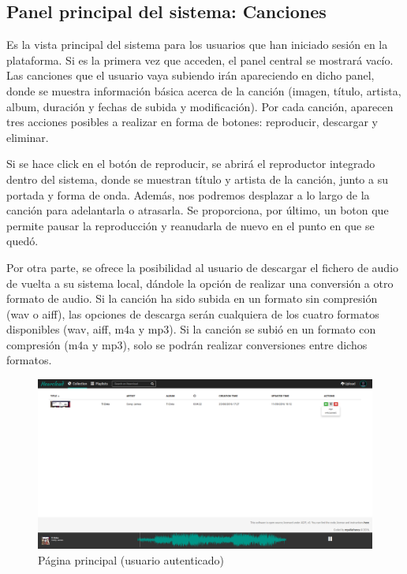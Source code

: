 \subsection{Panel principal del sistema: Canciones}

Es la vista principal del sistema para los usuarios que han iniciado sesión en la plataforma. Si es la primera vez que acceden, el panel central se mostrará vacío. Las canciones que el usuario vaya subiendo irán apareciendo en dicho panel, donde se muestra información básica acerca de la canción (imagen, título, artista, album, duración y fechas de subida y modificación). Por cada canción, aparecen tres acciones posibles a realizar en forma de botones: reproducir, descargar y eliminar.

Si se hace click en el botón de reproducir, se abrirá el reproductor integrado dentro del sistema, donde se muestran título y artista de la canción, junto a su portada y forma de onda. Además, nos podremos desplazar a lo largo de la canción para adelantarla o atrasarla. Se proporciona, por último, un boton que permite pausar la reproducción y reanudarla de nuevo en el punto en que se quedó.

Por otra parte, se ofrece la posibilidad al usuario de descargar el fichero de audio de vuelta a su sistema local, dándole la opción de realizar una conversión a otro formato de audio. Si la canción ha sido subida en un formato sin compresión (wav o aiff), las opciones de descarga serán cualquiera de los cuatro formatos disponibles (wav, aiff, m4a y mp3). Si la canción se subió en un formato con compresión (m4a y mp3), solo se podrán realizar conversiones entre dichos formatos.

\begin{figure}[H] 
\centering 
\includegraphics[scale=0.2]{../images/um/um_4.png}
\caption{Página principal (usuario autenticado)}
\end{figure}

